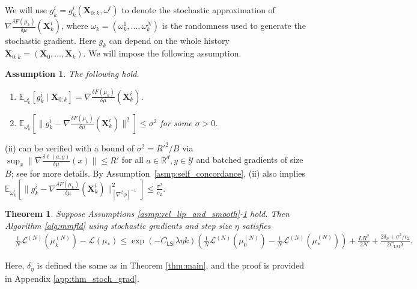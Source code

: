 \documentclass{article}
\newtheorem{theorem}{Theorem}[section]
\newtheorem{assumption}{Assumption}
\newcommand{\CLSI}[0]{C_{\mathsf{LSI}}}
\newcommand{\E}[0]{\mathbb{E}}
\begin{document}
We will use $g_k^i = g_k^i(\mathbf{X}_{0:k},\omega^i)$ to denote the stochastic approximation of $\nabla\frac{\delta F(\mu_k)}{\delta\mu}(\mathbf{X}_k^i)$, where $\omega_k = (\omega_k^1,\dots,\omega_k^N)$ is the randomness used to generate the stochastic gradient. Here $g_k$ can depend on the whole history $\mathbf{X}_{0:k}=(\mathbf{X}_0,\dots,\mathbf{X}_k)$. We will impose the following assumption.
\begin{assumption}\label{asmp:stoch_gradients}
    The following hold. 
    \begin{enumerate}
        \item[(i)] $\E_{\omega_k^i}[g_k^i\mid \mathbf{X}_{0:k}] = \nabla\frac{\delta F(\mu_k)}{\delta\mu}(\mathbf{X}_k^i)$.
        \item[(ii)] $\E_{\omega_k^i}[\|g_k^i - \nabla \frac{\delta F(\mu_k)}{\delta\mu}(\mathbf{X}_k^i)\|^2]\le \sigma^2$ for some $\sigma>0$.
    \end{enumerate}
\end{assumption}
(ii) can be verified with a bound of $\sigma^2 = {R'}^2/B$ via $\sup_x\|\nabla\frac{\delta\ell(a,y)}{\delta\mu}(x)\|\le R'$ for all $a\in\mathbb{R}^d,y\in\mathcal{Y}$ and batched gradients of size $B$; see \cite{suzuki2023meanfield} for more details. By Assumption~\ref{asmp:self_concordance}, (ii) also implies $\E_{\omega_k^i}[\|g_k^i - \nabla \frac{\delta F(\mu_k)}{\delta\mu}(\mathbf{X}_k^i)\|^2_{[\nabla^2\phi]^{-1}}]\le \frac{\sigma^2}{c_2}$. 

\begin{theorem}\label{thm:stoch_grad}
    Suppose Assumptions \ref{asmp:rel_lip_and_smooth}-\ref{asmp:stoch_gradients} hold. Then Algorithm \ref{alg:mmfld} using stochastic gradients and step size $\eta$ satisfies 
    \begin{align*}
    &\frac{1}{N}\mathcal{L}^{(N)}(\mu_k^{(N)}) - \mathcal{L}(\mu_*)\le \exp\left(-\CLSI \lambda\eta k\right)\left(\frac{1}{N}\mathcal{L}^{(N)}(\mu_0^{(N)}) - \frac{1}{N}\mathcal{L}^{(N)}(\mu_*^{(N)})\right)+ \frac{LR^2}{2N} + \frac{2\delta_\eta + \sigma^2/c_2}{2\CLSI\lambda}.    
    \end{align*}
\end{theorem}
Here, $\delta_\eta$ is defined the same as in Theorem \ref{thm:main}, and the proof is provided in Appendix \ref{app:thm_stoch_grad}. 


\end{document}
